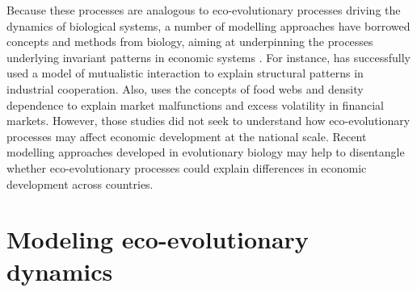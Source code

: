 % 
Because these processes are analogous to eco-evolutionary processes driving the dynamics of biological systems, a number of modelling approaches have borrowed concepts and methods from biology, aiming at underpinning the processes underlying invariant patterns in economic systems \citep{Tacchella2018,Saavedra2009a,Scholl2020,Zhang2018,Modis1997,Saavedra2014,Farmer1999,Michalakelis2011,Marasco2016,Gatabazi2019,Cauwels56,Applegate2021,Suweis2015}. 
% 
For instance, \citep{Saavedra2009a} has successfully used a model of mutualistic interaction to explain structural patterns in industrial cooperation.
% 
Also, \citep{Scholl2020} uses the concepts of food webs and density dependence to explain market malfunctions and excess volatility in financial markets.
% 
However, those studies did not seek to understand how eco-evolutionary processes may affect economic development at the national scale.
% 
Recent modelling approaches developed in evolutionary biology may help to disentangle whether eco-evolutionary processes could explain differences in economic development across countries.

\section{Modeling eco-evolutionary dynamics}

